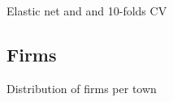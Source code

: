 \documentclass[12pt]{beamer}
\begin{document}
	
\begin{frame}{\textcolor{bscuro}{Elastic net and and 10-folds CV}}
	\begin{figure}[!ht] 
		\centering
	\end{figure}
\end{frame}


\subsection{Firms}


\begin{frame}{\textcolor{bscuro}{Distribution of firms per town}}
	\begin{figure}[!ht] 
		\centering
	\end{figure}
\end{frame}
\end{document}
